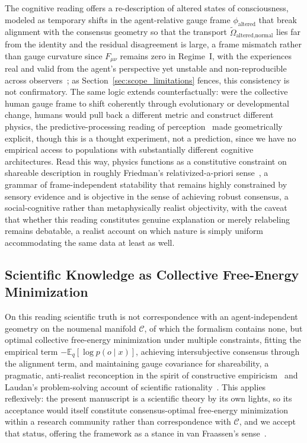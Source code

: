 \documentclass[11pt]{article}
\begin{document}
The cognitive reading offers a re-description of altered states of consciousness, modeled as temporary shifts in the agent-relative gauge frame $\phi_{\text{altered}}$ that break alignment with the consensus geometry so that the transport $\tilde{\Omega}_{\text{altered,normal}}$ lies far from the identity and the residual disagreement is large, a frame mismatch rather than gauge curvature since $F_{\mu\nu}$ remains zero in Regime~I, with the experiences real and valid from the agent's perspective yet unstable and non-reproducible across observers~\cite{Carhart-Harris2014, Swanson2018, CarhartHarrisFriston2019}; as Section~\ref{sec:scope_limitations} fences, this consistency is not confirmatory. The same logic extends counterfactually: were the collective human gauge frame to shift coherently through evolutionary or developmental change, humans would pull back a different metric and construct different physics, the predictive-processing reading of perception~\cite{Clark2016, Seth2021, Hoffman2019, hohwy2013predictive} made geometrically explicit, though this is a thought experiment, not a prediction, since we have no empirical access to populations with substantially different cognitive architectures. Read this way, physics functions as a constitutive constraint on shareable description in roughly Friedman's relativized-a-priori sense~\cite{Friedman2001}, a grammar of frame-independent statability that remains highly constrained by sensory evidence and is objective in the sense of achieving robust consensus, a social-cognitive rather than metaphysically realist objectivity, with the caveat that whether this reading constitutes genuine explanation or merely relabeling remains debatable, a realist account on which nature is simply uniform accommodating the same data at least as well.

\subsection{Scientific Knowledge as Collective Free-Energy Minimization}

On this reading scientific truth is not correspondence with an agent-independent geometry on the noumenal manifold $\mathcal{C}$, of which the formalism contains none, but optimal collective free-energy minimization under multiple constraints, fitting the empirical term $-\mathbb{E}_q[\log p(o \mid x)]$, achieving intersubjective consensus through the alignment term, and maintaining gauge covariance for shareability, a pragmatic, anti-realist reconception in the spirit of constructive empiricism~\cite{vanFraassen1980} and Laudan's problem-solving account of scientific rationality~\cite{Laudan1984}. This applies reflexively: the present manuscript is a scientific theory by its own lights, so its acceptance would itself constitute consensus-optimal free-energy minimization within a research community rather than correspondence with $\mathcal{C}$, and we accept that status, offering the framework as a stance in van Fraassen's sense~\cite{vanFraassen2002}.
\end{document}
